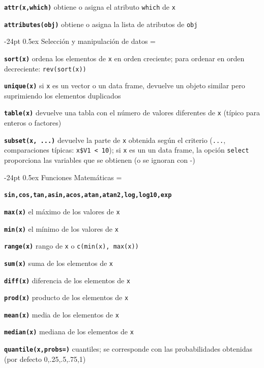 \documentclass[10pt,landscape]{article}
\makeatletter
\renewcommand\section{\@startsection{section}{1}{0mm}%
                                     {-24pt}%
                                     {0.5ex}%
                                {\color[rgb]{1,0.54902,0}\normalfont\large\bfseries}}
\newcommand{\code}{\texttt}
\newcommand{\bcode}[1]{\texttt{\textbf{#1}}}
\makeatother
\begin{document}
\begin{multicols*}{3}
\bcode{attr(x,which)} obtiene o asigna el atributo \code{which} de \code{x}

\bcode{attributes(obj)} obtiene o asigna la lista de atributos de \code{obj}





\section{Selección y manipulación de datos}
\everypar={\hangindent=9mm}

\bcode{sort(x)}  ordena los elementos de \code{x} en orden creciente; para ordenar en orden decreciente: \code{rev(sort(x))}

\bcode{unique(x)} si \code{x} es un vector o un data frame, devuelve un objeto similar pero suprimiendo los elementos duplicados  

\bcode{table(x)}  devuelve una tabla con el número de valores diferentes de \code{x} (típico para enteros o factores)

\bcode{subset(x, ...)}  devuelve la parte de \code{x} obtenida según el criterio (\code{...}, comparaciones típicas: \code{x\$V1 < 10}); si \code{x} es un un data frame, la opción \code{select} proporciona las variables que se obtienen (o se ignoran con -)




\section{Funciones Matemáticas}
\everypar={\hangindent=9mm}

\bcode{sin,cos,tan,asin,acos,atan,atan2,log,log10,exp}

\bcode{max(x)}  el máximo de los valores de \code{x}

\bcode{min(x)}  el mínimo de los valores de \code{x}

\bcode{range(x)}  rango de \code{x} o \code{c(min(x), max(x))}

\bcode{sum(x)}  suma de los elementos de \code{x}

\bcode{diff(x)}  diferencia de los elementos de \code{x}

\bcode{prod(x)}  producto de los elementos de \code{x}

\bcode{mean(x)}  media de los elementos de \code{x}

\bcode{median(x)}  mediana de los elementos de \code{x}

\bcode{quantile(x,probs=)} cuantiles;
     se corresponde con las probabilidades obtenidas (por defecto 0,.25,.5,.75,1)


\end{multicols*}
\end{document}
